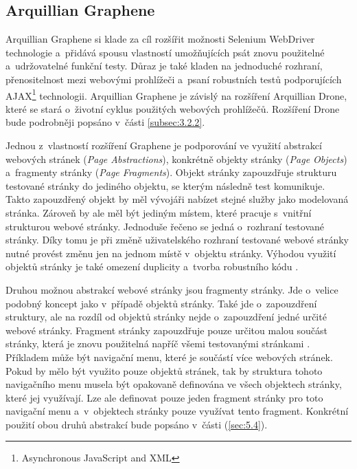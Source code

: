 \documentclass[
    color,   %
	table,   %
    twoside, %
    nolot, nolof,
]{fithesis3}
\begin{document}
\subsection{Arquillian Graphene}
\label{subsec:3.2.1}

Arquillian Graphene si klade za cíl rozšířit možnosti Selenium WebDriver technologie a~přidává spousu vlastností umožňujících psát znovu použitelné a~udržovatelné funkční testy. Důraz je také kladen na jednoduché rozhraní, přenositelnost mezi webovými prohlížeči a~psaní robustních testů podporujících AJAX\footnote{Asynchronous JavaScript and XML} technologii. Arquillian Graphene je závislý na rozšíření Arquillian Drone, které se stará o~životní cyklus použitých webových prohlížečů. Rozšíření Drone bude podrobněji popsáno v~části \ref{subsec:3.2.2}.

Jednou z~vlastností rozšíření Graphene je podporování ve využití abstrakcí webových stránek (\emph{Page Abstractions}), konkrétně objekty stránky (\emph{Page Objects}) a~fragmenty stránky (\emph{Page Fragments}). Objekt stránky zapouzdřuje strukturu testované stránky do jediného objektu, se kterým následně test komunikuje. Takto zapouzdřený objekt by měl vývojáři nabízet stejné služby jako modelovaná stránka. Zároveň by ale měl být jediným místem, které pracuje s~vnitřní strukturou webové stránky. Jednoduše řečeno se jedná o~rozhraní testované stránky. Díky tomu je při změně uživatelského rozhraní testované webové stránky nutné provést změnu jen na jednom místě v~objektu stránky. Výhodou využití objektů stránky je také omezení duplicity a~tvorba robustního kódu \cite{Selenium}.

Druhou možnou abstrakcí webové stránky jsou fragmenty stránky. Jde o~velice podobný koncept jako v~případě objektů stránky. Také jde o~zapouzdření struktury, ale na rozdíl od objektů stránky nejde o~zapouzdření jedné určité webové stránky. Fragment stránky zapouzdřuje pouze určitou malou součást stránky, která je znovu použitelná napříč všemi testovanými stránkami \cite{Graphene}. Příkladem může být navigační menu, které je součástí více webových stránek. Pokud by mělo být využito pouze objektů stránek, tak by struktura tohoto navigačního menu musela být opakovaně definována ve všech objektech stránky, které jej využívají. Lze ale definovat pouze jeden fragment stránky pro toto navigační menu a~v~objektech stránky pouze využívat tento fragment. Konkrétní použití obou druhů abstrakcí bude popsáno v~části (\ref{sec:5.4}).
\end{document}
